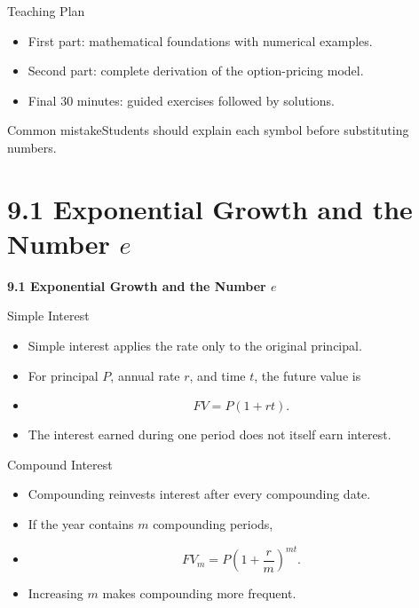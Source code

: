 \documentclass[aspectratio=169]{beamer}
\begin{document}
\begin{frame}[t]{Teaching Plan}
\justifying
\begin{itemize}
\item First part: mathematical foundations with numerical examples.
\item Second part: complete derivation of the option-pricing model.
\item Final 30 minutes: guided exercises followed by solutions.
\end{itemize}\begin{alertblock}{Common mistake}Students should explain each symbol before substituting numbers.\end{alertblock}
\end{frame}

\section{9.1 Exponential Growth and the Number $e$}
\begin{frame}[plain]
\centering\vfill
{\color{TitleBlue}\Large\bfseries 9.1 Exponential Growth and the Number $e$}\par
\vspace{0.5cm}{\large Why continuous time naturally creates an exponential function}\par
\vfill\end{frame}

\begin{frame}[t]{Simple Interest}
\justifying
\begin{itemize}
\item Simple interest applies the rate only to the original principal.
\item For principal $P$, annual rate $r$, and time $t$, the future value is
\item \[FV=P(1+rt).\]
\item The interest earned during one period does not itself earn interest.
\end{itemize}
\end{frame}

\begin{frame}[t]{Compound Interest}
\justifying
\begin{itemize}
\item Compounding reinvests interest after every compounding date.
\item If the year contains $m$ compounding periods,
\item \[FV_m=P\left(1+\frac{r}{m}\right)^{mt}.\]
\item Increasing $m$ makes compounding more frequent.
\end{itemize}
\end{frame}
\end{document}
